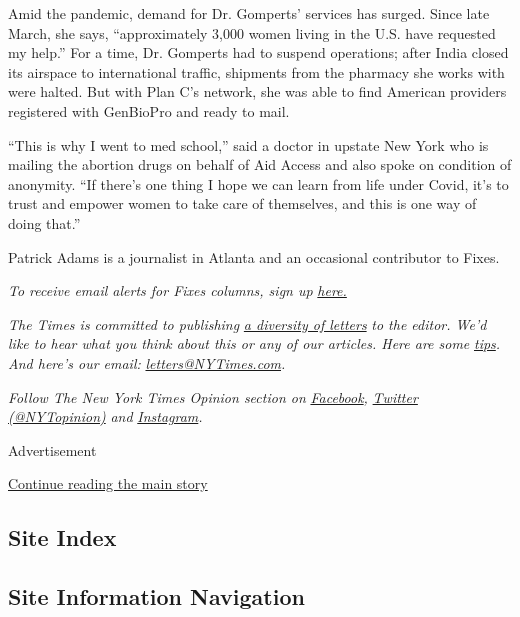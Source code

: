 Amid the pandemic, demand for Dr. Gomperts' services has surged. Since
late March, she says, ``approximately 3,000 women living in the U.S.
have requested my help.'' For a time, Dr. Gomperts had to suspend
operations; after India closed its airspace to international traffic,
shipments from the pharmacy she works with were halted. But with Plan
C's network, she was able to find American providers registered with
GenBioPro and ready to mail.

``This is why I went to med school,'' said a doctor in upstate New York
who is mailing the abortion drugs on behalf of Aid Access and also spoke
on condition of anonymity. ``If there's one thing I hope we can learn
from life under Covid, it's to trust and empower women to take care of
themselves, and this is one way of doing that.''

Patrick Adams is a journalist in Atlanta and an occasional contributor
to Fixes.

\emph{To receive email alerts for Fixes columns, sign up}
\href{http://eepurl.com/ABIxL}{\emph{here.}}

\emph{The Times is committed to publishing}
\href{https://www.nytimes3xbfgragh.onion/2019/01/31/opinion/letters/letters-to-editor-new-york-times-women.html}{\emph{a
diversity of letters}} \emph{to the editor. We'd like to hear what you
think about this or any of our articles. Here are some}
\href{https://help.nytimes3xbfgragh.onion/hc/en-us/articles/115014925288-How-to-submit-a-letter-to-the-editor}{\emph{tips}}\emph{.
And here's our email:}
\href{mailto:letters@NYTimes.com}{\emph{letters@NYTimes.com}}\emph{.}

\emph{Follow The New York Times Opinion section on}
\href{https://www.facebookcorewwwi.onion/nytopinion}{\emph{Facebook}}\emph{,}
\href{http://twitter.com/NYTOpinion}{\emph{Twitter (@NYTopinion)}}
\emph{and}
\href{https://www.instagram.com/nytopinion/}{\emph{Instagram}}\emph{.}

Advertisement

\protect\hyperlink{after-bottom}{Continue reading the main story}

\hypertarget{site-index}{%
\subsection{Site Index}\label{site-index}}

\hypertarget{site-information-navigation}{%
\subsection{Site Information
Navigation}\label{site-information-navigation}}

